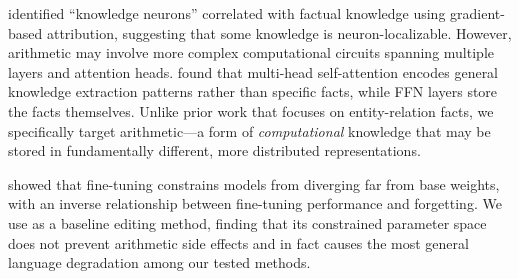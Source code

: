 \citet{dai2022knowledge} identified ``knowledge neurons'' correlated with factual knowledge using gradient-based attribution, suggesting that some knowledge is neuron-localizable.
However, arithmetic may involve more complex computational circuits spanning multiple layers and attention heads.
\citet{li2023pmet} found that multi-head self-attention encodes general knowledge extraction patterns rather than specific facts, while FFN layers store the facts themselves.
Unlike prior work that focuses on entity-relation facts, we specifically target arithmetic---a form of \emph{computational} knowledge that may be stored in fundamentally different, more distributed representations.

\citet{biderman2024lora} showed that \lora fine-tuning constrains models from diverging far from base weights, with an inverse relationship between fine-tuning performance and forgetting.
We use \lora as a baseline editing method, finding that its constrained parameter space does not prevent arithmetic side effects and in fact causes the most general language degradation among our tested methods.
